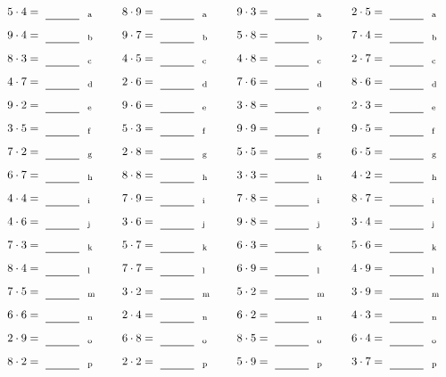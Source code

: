 \documentclass
[
  draft    = true,
  fontsize = 11pt,
  parskip  = half-
]
{scrartcl}
\begin{document}
\par\vfill\par
\begin{align*}
    \pline{5\cdot4}&=\rline{a}
  & \pline{8\cdot9}&=\rline{a}
  & \pline{9\cdot3}&=\rline{a}
  & \pline{2\cdot5}&=\rline{a} \\[1ex]
    \pline{9\cdot4}&=\rline{b}
  & \pline{9\cdot7}&=\rline{b}
  & \pline{5\cdot8}&=\rline{b}
  & \pline{7\cdot4}&=\rline{b} \\[1ex]
    \pline{8\cdot3}&=\rline{c}
  & \pline{4\cdot5}&=\rline{c}
  & \pline{4\cdot8}&=\rline{c}
  & \pline{2\cdot7}&=\rline{c} \\[1ex]
    \pline{4\cdot7}&=\rline{d}
  & \pline{2\cdot6}&=\rline{d}
  & \pline{7\cdot6}&=\rline{d}
  & \pline{8\cdot6}&=\rline{d} \\[1ex]
    \pline{9\cdot2}&=\rline{e}
  & \pline{9\cdot6}&=\rline{e}
  & \pline{3\cdot8}&=\rline{e}
  & \pline{2\cdot3}&=\rline{e} \\[1ex]
    \pline{3\cdot5}&=\rline{f}
  & \pline{5\cdot3}&=\rline{f}
  & \pline{9\cdot9}&=\rline{f}
  & \pline{9\cdot5}&=\rline{f} \\[1ex]
    \pline{7\cdot2}&=\rline{g}
  & \pline{2\cdot8}&=\rline{g}
  & \pline{5\cdot5}&=\rline{g}
  & \pline{6\cdot5}&=\rline{g} \\[1ex]
    \pline{6\cdot7}&=\rline{h}
  & \pline{8\cdot8}&=\rline{h}
  & \pline{3\cdot3}&=\rline{h}
  & \pline{4\cdot2}&=\rline{h} \\[1ex]
    \pline{4\cdot4}&=\rline{i}
  & \pline{7\cdot9}&=\rline{i}
  & \pline{7\cdot8}&=\rline{i}
  & \pline{8\cdot7}&=\rline{i} \\[1ex]
    \pline{4\cdot6}&=\rline{j}
  & \pline{3\cdot6}&=\rline{j}
  & \pline{9\cdot8}&=\rline{j}
  & \pline{3\cdot4}&=\rline{j} \\[1ex]
    \pline{7\cdot3}&=\rline{k}
  & \pline{5\cdot7}&=\rline{k}
  & \pline{6\cdot3}&=\rline{k}
  & \pline{5\cdot6}&=\rline{k} \\[1ex]
    \pline{8\cdot4}&=\rline{l}
  & \pline{7\cdot7}&=\rline{l}
  & \pline{6\cdot9}&=\rline{l}
  & \pline{4\cdot9}&=\rline{l} \\[1ex]
    \pline{7\cdot5}&=\rline{m}
  & \pline{3\cdot2}&=\rline{m}
  & \pline{5\cdot2}&=\rline{m}
  & \pline{3\cdot9}&=\rline{m} \\[1ex]
    \pline{6\cdot6}&=\rline{n}
  & \pline{2\cdot4}&=\rline{n}
  & \pline{6\cdot2}&=\rline{n}
  & \pline{4\cdot3}&=\rline{n} \\[1ex]
    \pline{2\cdot9}&=\rline{o}
  & \pline{6\cdot8}&=\rline{o}
  & \pline{8\cdot5}&=\rline{o}
  & \pline{6\cdot4}&=\rline{o} \\[1ex]
    \pline{8\cdot2}&=\rline{p}
  & \pline{2\cdot2}&=\rline{p}
  & \pline{5\cdot9}&=\rline{p}
  & \pline{3\cdot7}&=\rline{p}
\end{align*}
\end{document}
